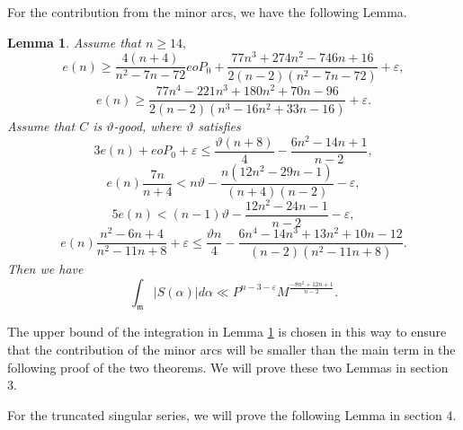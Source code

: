 \documentclass[12pt]{amsart}
\newtheorem{lemma}[theorem]{Lemma}
\theoremstyle{definition}
\numberwithin{equation}{section}
\begin{document}
For the contribution from the minor arcs, we have the following Lemma.
\begin{lemma}
    \label{contribution_minor_normal}
Assume that $n \geq 14,$  
\begin{equation}  %
    \label{lemma_3.2_right_Q_1}
    e(n) \geq \frac{4(n+4)}{n^2-7n-72}eoP_0+\frac{77n^3+274n^2-746n+16}{2(n-2)(n^2-7n-72)}+\varepsilon,
\end{equation}
\begin{equation}
    \label{Unexpected pregnancy}
    e(n) \geq \frac{77n^4-221n^3+180n^2+70n-96}{2(n-2)(n^3-16n^2+33n-16)}+\varepsilon.
\end{equation}
Assume that $C$ is $\vartheta$-good, where $\vartheta$ satisfies 
\begin{equation} %
    \label{minor_requir_vartheta_specific_1}
    3e(n)+eoP_0+\varepsilon \leq \frac{\vartheta(n+8)}{4}-\frac{6n^2-14n+1}{n-2} ,
\end{equation}
\begin{equation}  %
    \label{good_demand_2}
    e(n)\frac{7n}{n+4}< n\vartheta-\frac{n(12n^2-29n-1)}{(n+4)(n-2)}-\varepsilon,
\end{equation}
\begin{equation} %
    \label{good_demand_3}
    5e(n) < (n-1)\vartheta-\frac{12n^2-24n-1}{n-2}-\varepsilon,
\end{equation}
\begin{equation} %
    \label{the_critical_when_general}
    e(n)\frac{n^2-6n+4}{n^2-11n+8}+\varepsilon
    \leq \frac{\vartheta n}{4}-\frac{6n^4-14n^3+13n^2+10n-12}{(n-2)(n^2-11n+8)}.
\end{equation}
Then we have
\begin{equation*}
    \int_{\mathfrak{m}}|S(\alpha)|d\alpha \ll P^{n-3-\varepsilon}M^{\frac{-8n^2+12n+1}{n-2}}.
\end{equation*}
\end{lemma}

The upper bound of the integration in Lemma \ref{contribution_minor_normal} is chosen in this way to ensure that the contribution of the minor arcs will be smaller than the main term in the following proof of the two theorems. We will prove these two Lemmas in section 3. 



For the truncated singular series, we will prove the following Lemma in section 4.
\end{document}
